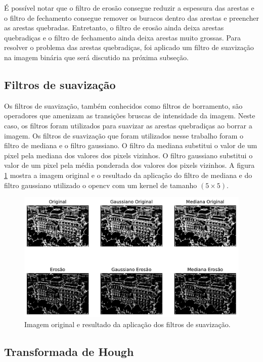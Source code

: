 \documentclass[12pt]{article}
\begin{document}
É possível notar que o filtro de erosão consegue reduzir a espessura das arestas e o filtro de fechamento consegue remover os buracos dentro das arestas e preencher as arestas quebradas. Entretanto, o filtro de erosão ainda deixa arestas quebradiças e o filtro de fechamento ainda deixa arestas muito grossas. Para resolver o problema das arestas quebradiças, foi aplicado um filtro de suavização na imagem binária que será discutido na próxima subseção.

\subsection{Filtros de suavização}

Os filtros de suavização, também conhecidos como filtros de borramento, são operadores que amenizam as transições bruscas de intensidade da imagem. Neste caso, os filtros foram utilizados para suavizar as arestas quebradiças ao borrar a imagem. Os filtros de suavização que foram utilizados nesse trabalho foram o filtro de mediana e o filtro gaussiano. O filtro da mediana substitui o valor de um pixel pela mediana dos valores dos pixels vizinhos. O filtro gaussiano substitui o valor de um pixel pela média ponderada dos valores dos pixels vizinhos. A figura \ref{fig:blur} mostra a imagem original e o resultado da aplicação do filtro de mediana e do filtro gaussiano utilizado o opencv \cite{opencv_blur} com um kernel de tamanho $(5\times5)$.

\begin{figure}
\centering
\includegraphics[scale=0.60]{blur.pdf}
\caption{Imagem original e resultado da aplicação dos filtros de suavização.}
\label{fig:blur}
\end{figure}



\subsection{Transformada de Hough}
\end{document}
